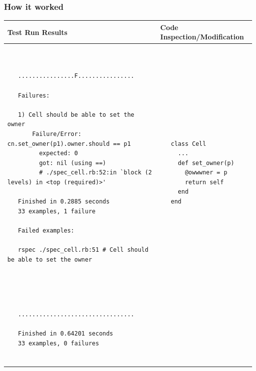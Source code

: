 \documentclass[a4wide, 11pt]{article}
\begin{document}
  \subsubsection{How it worked}
\begin{center}
  \begin{tabular}{ | l | l |}
    \hline
    Test Run Results & Code Inspection/Modification \\
    \hline
    \begin{minipage}{110mm}
      \begin{scriptsize}
        \begin{verbatim}
          
          
   ................F................
   
   Failures:
   
   1) Cell should be able to set the owner
       Failure/Error: cn.set_owner(p1).owner.should == p1
         expected: 0
         got: nil (using ==)
         # ./spec_cell.rb:52:in `block (2 levels) in <top (required)>'
   
   Finished in 0.2885 seconds
   33 examples, 1 failure
   
   Failed examples:
   
   rspec ./spec_cell.rb:51 # Cell should be able to set the owner
   
        \end{verbatim}
      \end{scriptsize}
    \end{minipage}
    &
    \begin{minipage}{40mm}
      \begin{scriptsize}
        \begin{verbatim}
          
          
   class Cell
     ...
     def set_owner(p)
       @owwwner = p
       return self
     end
   end

        \end{verbatim}
      \end{scriptsize}
    \end{minipage}
    \\
    \hline

    \begin{minipage}{110mm}
      \begin{scriptsize}
        \begin{verbatim}
          
          
   .................................
   
   Finished in 0.64201 seconds
   33 examples, 0 failures
   

\end{verbatim}
\end{scriptsize}
\end{minipage}
\end{tabular}
\end{center}
\end{document}
